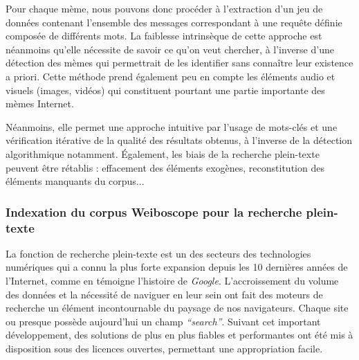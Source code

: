     Pour chaque mème, nous pouvons donc procéder à l{\textquoteright}extraction d{\textquoteright}un jeu de données contenant l{\textquoteright}ensemble des messages correspondant à une requête définie composée de différents mots. La faiblesse intrinsèque de cette approche est néanmoins qu'elle nécessite de savoir ce qu'on veut chercher, à l'inverse d'une détection des mèmes qui permettrait de les identifier sans connaître leur existence a priori. Cette méthode prend également peu en compte les éléments audio et visuels (images, vidéos) qui constituent pourtant une partie importante des mèmes Internet. 

    Néanmoins, elle permet une approche intuitive par l'usage de mots-clés et une vérification itérative de la qualité des résultats obtenus, à l'inverse de la détection algorithmique notamment. Également, les biais de la recherche plein-texte peuvent être rétablis : effacement des éléments exogènes, reconstitution des éléments manquants du corpus... 

\subsubsection[Indexation pour la recherche plein-texte]{Indexation du corpus Weiboscope pour la recherche plein-texte}

    La fonction de recherche plein-texte est un des secteurs des technologies numériques qui a connu la plus forte expansion depuis les 10 dernières années de l'Internet, comme en témoigne l'histoire de \textit{Google}. L'accroissement du volume des données et la nécessité de naviguer en leur sein ont fait des moteurs de recherche un élément incontournable du paysage de nos navigateurs. Chaque site ou presque possède aujourd'hui un champ \textit{``search''}. Suivant cet important développement, des solutions de plus en plus fiables et performantes ont été mis à disposition sous des licences ouvertes, permettant une appropriation facile.

